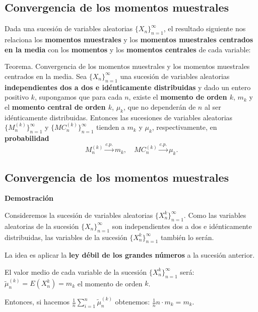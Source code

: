 \documentclass[]{book}
\begin{document}
\hypertarget{convergencia-de-los-momentos-muestrales-5}{%
\subsection{Convergencia de los momentos muestrales}\label{convergencia-de-los-momentos-muestrales-5}}

Dada una sucesión de variables aleatorias \(\{X_n\}_{n=1}^\infty\), el resultado siguiente nos relaciona los \textbf{momentos muestrales} y los \textbf{momentos muestrales centrados en la media} con los \textbf{momentos} y los \textbf{momentos centrales} de cada variable:

 Teorema. Convergencia de los momentos muestrales y los momentos muestrales centrados en la media.
Sea \(\{X_n\}_{n=1}^\infty\) una sucesión de variables aleatorias \textbf{independientes dos a dos e idénticamente distribuidas} y dado un entero positivo \(k\), supongamos que para cada \(n\), existe el \textbf{momento de orden \(k\)}, \(m_k\) y el \textbf{momento central de orden \(k\)}, \(\mu_k\), que no dependerán de \(n\) al ser idénticamente distribuidas. Entonces las sucesiones de variables aleatorias \(\{M_n^{(k)}\}_{n=1}^\infty\) y \(\{MC_n^{(k)}\}_{n=1}^\infty\) tienden a \(m_k\) y \(\mu_k\), respectivamente, en \textbf{probabilidad}
\[
M_n^{(k)}\stackrel{c.p.}{\longrightarrow} m_k,\quad MC_n^{(k)}\stackrel{c.p.}{\longrightarrow} \mu_k.
\]

\hypertarget{convergencia-de-los-momentos-muestrales-6}{%
\subsection{Convergencia de los momentos muestrales}\label{convergencia-de-los-momentos-muestrales-6}}

\textbf{Demostración}

Consideremos la sucesión de variables aleatorias \(\{X_n^k\}_{n=1}^\infty\). Como las variables aleatorias de la sucesión \(\{X_n\}_{n=1}^\infty\) son independientes dos a dos e idénticamente distribuidas, las variables de la sucesión \(\{X_n^k\}_{n=1}^\infty\) también lo serán.

La idea es aplicar la \textbf{ley débil de los grandes números} a la sucesión anterior.

El valor medio de cada variable de la sucesión \(\{X_n^k\}_{n=1}^\infty\) será: \(\tilde{\mu}_n^{(k)}= E(X_n^{k})=m_k\) el momento de orden \(k\).

Entonces, si hacemos \(\frac{1}{n}\sum\limits_{i=1}^n \tilde{\mu}_n^{(k)}\) obtenemos:
\(\frac{1}{n} n\cdot m_k=m_k.\)
\end{document}
